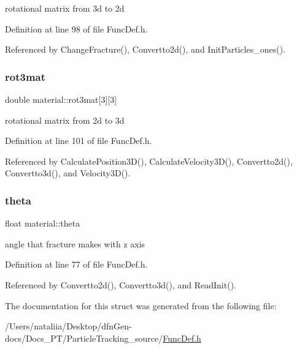 rotational matrix from 3d to 2d 

Definition at line 98 of file Func\+Def.\+h.



Referenced by Change\+Fracture(), Convertto2d(), and Init\+Particles\+\_\+ones().

\mbox{\label{structmaterial_a8df25744238b2b814530d49ad58f484d}} 
\subsubsection{\texorpdfstring{rot3mat}{rot3mat}}
{\footnotesize\ttfamily double material\+::rot3mat\mbox{[}3\mbox{]}\mbox{[}3\mbox{]}}

rotational matrix from 2d to 3d 

Definition at line 101 of file Func\+Def.\+h.



Referenced by Calculate\+Position3\+D(), Calculate\+Velocity3\+D(), Convertto2d(), Convertto3d(), and Velocity3\+D().

\mbox{\label{structmaterial_add2db22d2a9dd5c1c2ec6f14038d43f6}} 
\subsubsection{\texorpdfstring{theta}{theta}}
{\footnotesize\ttfamily float material\+::theta}

angle that fracture makes with z axis 

Definition at line 77 of file Func\+Def.\+h.



Referenced by Convertto2d(), Convertto3d(), and Read\+Init().



The documentation for this struct was generated from the following file\+:\begin{DoxyCompactItemize}
\item 
/\+Users/nataliia/\+Desktop/dfn\+Gen-\/docs/\+Docs\+\_\+\+P\+T/\+Particle\+Tracking\+\_\+source/\mbox{\hyperlink{_func_def_8h}{Func\+Def.\+h}}\end{DoxyCompactItemize}
